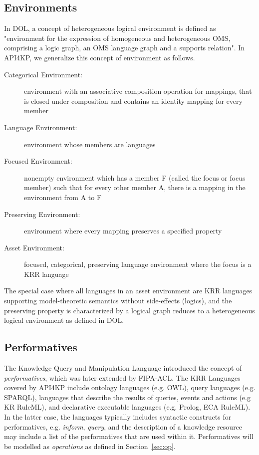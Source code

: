 \documentclass[runningheads]{llncs}
\begin{document}
\subsection{Environments}
In DOL, a concept of heterogeneous logical environment is defined as 
"environment for the
expression of homogeneous and heterogeneous OMS, comprising
a logic graph, an OMS language graph and a supports relation".
In API4KP, we generalize this concept of environment as follows.
\label{krassetenv}
\begin{description}
\item[Categorical Environment:] environment with an associative composition operation for mappings, that is closed under composition and contains an identity mapping for every member
\item[Language Environment:] environment whose members are languages
\item[Focused Environment:] nonempty environment which has a member F (called the focus or focus member) such that for every other member A, there is a mapping in the environment from A to F
\item[Preserving Environment:] environment where every mapping preserves a specified property
\item[Asset Environment:] focused, categorical, preserving language environment where the focus is a KRR language
\end{description}
The special case where all languages in an asset environment are KRR languages supporting model-theoretic semantics without side-effects (logics), and the preserving property is characterized by a logical graph reduces to a heterogeneous logical environment as defined in DOL.

\subsection{Performatives}
The Knowledge Query and Manipulation Language\cite{Finin:1994:KAC:191246.191322} introduced the concept of \emph{performatives}, which was later extended by FIPA-ACL\cite{FIPA-ACL}.
The KRR Languages covered by API4KP include ontology languages (e.g. OWL), query languages (e.g. SPARQL), languages that describe the results of queries, events and actions (e.g KR RuleML), and declarative executable languages (e.g. Prolog, ECA RuleML). In the latter case, the languages typically includes syntactic constructs for performatives, e.g. \emph{inform}, \emph{query}, and the description of a knowledge resource may include a list of the performatives that are used within it.  Performatives will be modelled as \emph{operations} as defined in Section~\ref{sec:op}.
\end{document}
